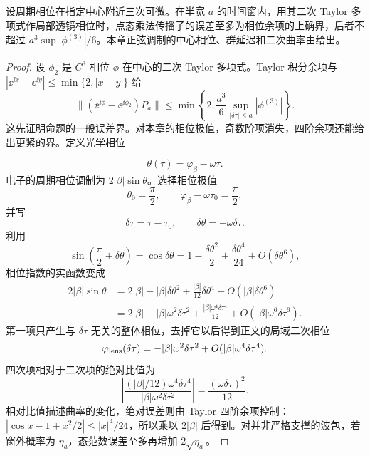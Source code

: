\begin{proposition}[周期相位的局部二次展开]
设周期相位在指定中心附近三次可微。在半宽 $a$ 的时间窗内，用其二次 Taylor 多项式作局部透镜相位时，点态乘法传播子的误差至多为相位余项的上确界，后者不超过 $a^3\sup|\phi^{(3)}|/6$。本章正弦调制的中心相位、群延迟和二次曲率由给出。
\end{proposition}
\begin{proof}
设 $\phi_2$ 是 $C^3$ 相位 $\phi$ 在中心的二次 Taylor 多项式。Taylor 积分余项与 $|\ee^{\ii x}-\ee^{\ii y}|\le\min\{2,|x-y|\}$ 给
\[
\|(\ee^{\ii\phi}-\ee^{\ii\phi_2})P_a\|
\le\min\left\{2,\frac{a^3}{6}\sup_{|\delta\tau|\le a}|\phi^{(3)}|\right\}.
\]
这先证明命题的一般误差界。对本章的相位极值，奇数阶项消失，四阶余项还能给出更紧的界。定义光学相位

\begin{equation*}
\theta(\tau)=\varphi_\beta-\omega\tau .
\end{equation*}
电子的周期相位调制为 $2|\beta|\sin\theta$。选择相位极值
\begin{equation*}
\theta_0=\frac{\pi}{2},
\qquad
\varphi_\beta-\omega\tau_0=\frac{\pi}{2},
\end{equation*}
并写
\begin{equation*}
\delta\tau=\tau-\tau_0,
\qquad
\delta\theta=-\omega\delta\tau.
\end{equation*}
利用
\begin{equation*}
\sin\!\left(\frac\pi2+\delta\theta\right)
=\cos\delta\theta
=1-\frac{\delta\theta^2}{2}
+\frac{\delta\theta^4}{24}
+O(\delta\theta^6),
\end{equation*}
相位指数的实函数变成
\begin{align*}
2|\beta|\sin\theta
&=2|\beta|
-|\beta|\delta\theta^2
+\frac{|\beta|}{12}\delta\theta^4
+O(|\beta|\delta\theta^6)\\
&=2|\beta|
-|\beta|\omega^2\delta\tau^2
+\frac{|\beta|\omega^4\delta\tau^4}{12}
+O(|\beta|\omega^6\delta\tau^6).
\end{align*}
第一项只产生与 $\delta\tau$ 无关的整体相位，去掉它以后得到正文的局域二次相位
\begin{equation*}
\varphi_{\rm lens}(\delta\tau)
=-|\beta|\omega^2\delta\tau^2
+O(|\beta|\omega^4\delta\tau^4).
\end{equation*}
四次项相对于二次项的绝对比值为
\begin{equation*}
\left|
\frac{(|\beta|/12)\omega^4\delta\tau^4}
{|\beta|\omega^2\delta\tau^2}
\right|
=\frac{(\omega\delta\tau)^2}{12}.
\end{equation*}
相对比值描述曲率的变化，绝对误差则由 Taylor 四阶余项控制：$|\cos x-1+x^2/2|\le|x|^4/24$，所以乘以 $2|\beta|$ 后得到。对并非严格支撑的波包，若窗外概率为 $\eta_a$，态范数误差至多再增加 $2\sqrt{\eta_a}$。
\end{proof}


